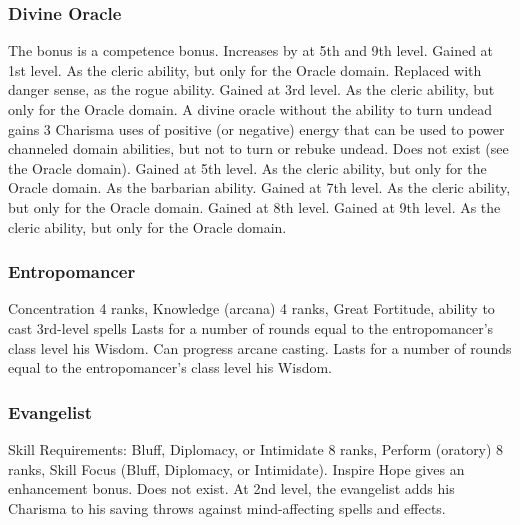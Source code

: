 \subsubsection{Divine Oracle}
 The bonus is a competence bonus. Increases by  at 5th and 9th level.
 Gained at 1st level. As the cleric ability, but only for the Oracle domain.
 Replaced with danger sense, as the rogue ability.
 Gained at 3rd level. As the cleric ability, but only for the Oracle domain. A divine oracle without the ability to turn undead gains 3 \add Charisma uses of positive (or negative) energy that can be used to power channeled domain abilities, but not to turn or rebuke undead.
 Does not exist (see the Oracle domain).
 Gained at 5th level. As the cleric ability, but only for the Oracle domain.
 As the barbarian ability.
 Gained at 7th level. As the cleric ability, but only for the Oracle domain.
 Gained at 8th level.
 Gained at 9th level. As the cleric ability, but only for the Oracle domain.
\subsubsection{Entropomancer}
 Concentration 4 ranks, Knowledge (arcana) 4 ranks, Great Fortitude, ability to cast 3rd-level spells
 Lasts for a number of rounds equal to the entropomancer's class level \add his Wisdom.
 Can progress arcane casting.
 Lasts for a number of rounds equal to the entropomancer's class level \add his Wisdom.
\subsubsection{Evangelist}
 Skill Requirements: Bluff, Diplomacy, or Intimidate 8 ranks, Perform (oratory) 8 ranks, Skill Focus (Bluff, Diplomacy, or Intimidate).
 Inspire Hope gives an enhancement bonus.
 Does not exist.
 At 2nd level, the evangelist adds his Charisma to his saving throws against mind-affecting spells and effects.
